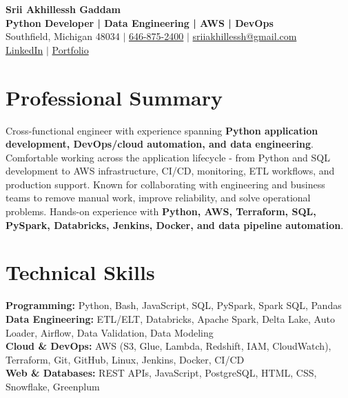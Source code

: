 \documentclass[letterpaper,10pt]{article}
\begin{document}
\fontsize{9.35pt}{10.45pt}\selectfont

\begin{center}
    {\LARGE \textbf{Srii Akhillessh Gaddam}} \\[-1pt]
    \textbf{Python Developer | Data Engineering | AWS | DevOps} \\[2pt]
    Southfield, Michigan 48034 $|$
    \href{tel:6468752400}{646-875-2400} $|$
    \href{mailto:sriiakhillessh@gmail.com}{sriiakhillessh@gmail.com} \\[1pt]
    \href{https://www.linkedin.com/in/srii-akhiilessh-gaddam-b48668191/}{LinkedIn} $|$
    \href{https://sriiakhillesshg.github.io/portfolio/}{Portfolio}
\end{center}
\vspace{-8pt}

\section{Professional Summary}
\small{Cross-functional engineer with experience spanning \textbf{Python application development, DevOps/cloud automation, and data engineering}. Comfortable working across the application lifecycle - from Python and SQL development to AWS infrastructure, CI/CD, monitoring, ETL workflows, and production support. Known for collaborating with engineering and business teams to remove manual work, improve reliability, and solve operational problems. Hands-on experience with \textbf{Python, AWS, Terraform, SQL, PySpark, Databricks, Jenkins, Docker, and data pipeline automation}.}

\section{Technical Skills}
\small{
\textbf{Programming:} Python, Bash, JavaScript, SQL, PySpark, Spark SQL, Pandas \\
\textbf{Data Engineering:} ETL/ELT, Databricks, Apache Spark, Delta Lake, Auto Loader, Airflow, Data Validation, Data Modeling \\
\textbf{Cloud \& DevOps:} AWS (S3, Glue, Lambda, Redshift, IAM, CloudWatch), Terraform, Git, GitHub, Linux, Jenkins, Docker, CI/CD \\
\textbf{Web \& Databases:} REST APIs, JavaScript, PostgreSQL, HTML, CSS, Snowflake, Greenplum
}
\end{document}
